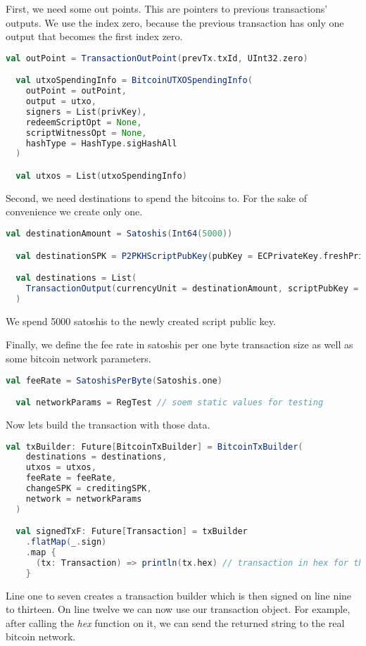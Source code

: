 First, we need some out points.
This are pointers to previous transactions' outputs.
We use the index zero, because the previous transaction has only one output that becomes the first index zero.
\begin{lstlisting}[language=scala]
  val outPoint = TransactionOutPoint(prevTx.txId, UInt32.zero)

  val utxoSpendingInfo = BitcoinUTXOSpendingInfo(
    outPoint = outPoint,
    output = utxo,
    signers = List(privKey),
    redeemScriptOpt = None,
    scriptWitnessOpt = None,
    hashType = HashType.sigHashAll
  )

  val utxos = List(utxoSpendingInfo)
\end{lstlisting}

Second, we need destinations to spend the bitcoins to.
For the sake of convenience we create only one.
\begin{lstlisting}[language=scala]
  val destinationAmount = Satoshis(Int64(5000))

  val destinationSPK = P2PKHScriptPubKey(pubKey = ECPrivateKey.freshPrivateKey.publicKey)

  val destinations = List(
    TransactionOutput(currencyUnit = destinationAmount, scriptPubKey = destinationSPK)
  )
\end{lstlisting}

We spend 5000 satoshis to the newly created script public key.

Finally, we define the fee rate in satoshis per one byte transaction size as well as some bitcoin network parameters.
\begin{lstlisting}[language=scala]
  val feeRate = SatoshisPerByte(Satoshis.one)

  val networkParams = RegTest // soem static values for testing
\end{lstlisting}


Now lets build the transaction with those data.
\begin{lstlisting}[language=scala]
  val txBuilder: Future[BitcoinTxBuilder] = BitcoinTxBuilder(
    destinations = destinations,
    utxos = utxos,
    feeRate = feeRate,
    changeSPK = creditingSPK,
    network = networkParams
  )

  val signedTxF: Future[Transaction] = txBuilder
    .flatMap(_.sign)
    .map {
      (tx: Transaction) => println(tx.hex) // transaction in hex for the bitcoin network
    }
\end{lstlisting}

Line one to seven creates a transaction builder which is then signed on line nine to thirteen.
On line twelve we can now use our transaction object.
For example, after calling the \emph{hex} function on it, we can send the returned string to the real bitcoin network.



